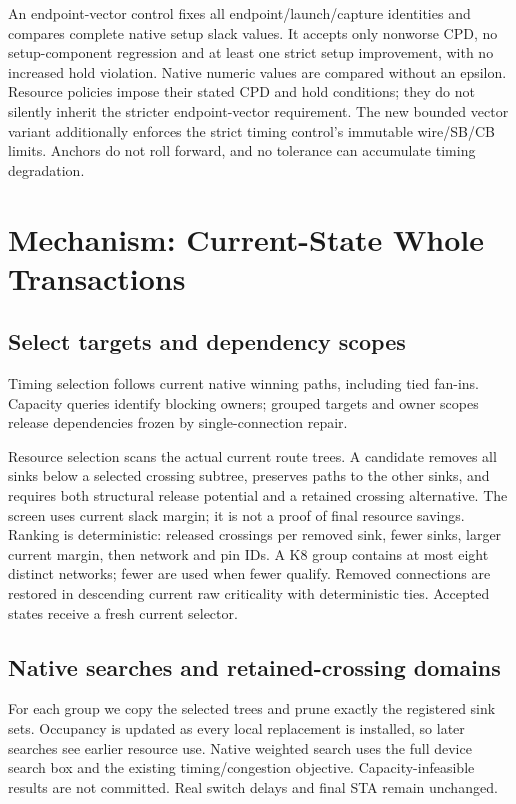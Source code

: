 \documentclass[conference,10pt]{IEEEtran}
\begin{document}
An endpoint-vector control fixes all endpoint/launch/capture identities and compares complete native setup slack values. It accepts only nonworse CPD, no setup-component regression and at least one strict setup improvement, with no increased hold violation. Native numeric values are compared without an epsilon. Resource policies impose their stated CPD and hold conditions; they do not silently inherit the stricter endpoint-vector requirement. The new bounded vector variant additionally enforces the strict timing control's immutable wire/SB/CB limits. Anchors do not roll forward, and no tolerance can accumulate timing degradation.

\section{Mechanism: Current-State Whole Transactions}
\subsection{Select targets and dependency scopes}
Timing selection follows current native winning paths, including tied fan-ins. Capacity queries identify blocking owners; grouped targets and owner scopes release dependencies frozen by single-connection repair.

Resource selection scans the actual current route trees. A candidate removes all sinks below a selected crossing subtree, preserves paths to the other sinks, and requires both structural release potential and a retained crossing alternative. The screen uses current slack margin; it is not a proof of final resource savings. Ranking is deterministic: released crossings per removed sink, fewer sinks, larger current margin, then network and pin IDs. A K8 group contains at most eight distinct networks; fewer are used when fewer qualify. Removed connections are restored in descending current raw criticality with deterministic ties. Accepted states receive a fresh current selector.

\subsection{Native searches and retained-crossing domains}
For each group we copy the selected trees and prune exactly the registered sink sets. Occupancy is updated as every local replacement is installed, so later searches see earlier resource use. Native weighted search uses the full device search box and the existing timing/congestion objective. Capacity-infeasible results are not committed. Real switch delays and final STA remain unchanged.
\end{document}

